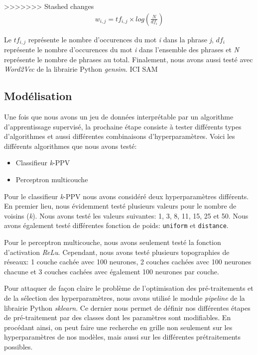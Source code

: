 >>>>>>> Stashed changes
\begin{gather}
  w_{i,j} = tf_{i,j} \times log(\frac{N}{df_i})
\end{gather}

Le $tf_{i,j}$ représente le nombre d'occurences du mot \textit{i} dans la phrase \textit{j}, $df_i$ représente le nombre d'occurences du mot \textit{i} dans l'ensemble des phrases et \textit{N} représente le nombre de phrases au total. 
Finalement, nous avons aussi testé avec \textit{Word2Vec} de la librairie Python \textit{gensim}. ICI SAM


\subsection{Modélisation}

Une fois que nous avons un jeu de données interprétable par un algorithme d'apprentissage supervisé, la prochaine étape consiste à tester différents types d'algorithmes et aussi différentes combinaisons d'hyperparamètres. Voici les différents algorithmes que nous avons testé:

\begin{itemize}
  \item Classifieur \textit{k}-PPV
  \item Perceptron multicouche
\end{itemize}

Pour le classifieur \textit{k}-PPV nous avons considéré deux hyperparamètres différents. En premier lieu, nous évidemment testé plusieurs valeurs pour le nombre de voisins (\textit{k}). Nous avons testé les valeurs suivantes: 1, 3, 8, 11, 15, 25 et 50. 
Nous avons également testé différentes fonction de poids: \texttt{uniform} et \texttt{distance}.

Pour le perceptron multicouche, nous avons seulement testé la fonction d'activation \textit{ReLu}. Cependant, nous avons testé plusieurs topographies de réseaux: 1 couche cachée avec 100 neurones, 2 couches cachées avec 100 neurones chacune et 3 couches cachées avec également 100 neurones par couche.
\break

Pour attaquer de façon claire le problème de l'optimisation des pré-traitements et de la sélection des hyperparamètres, nous avons utilisé le module \emph{pipeline} de la librairie Python \emph{sklearn}. Ce dernier nous permet de définir nos différentes étapes de pré-traitement par des classes dont les paramètres sont modifiables. En procédant ainsi, on peut faire une recherche en grille non seulement sur les hyperparamètres de nos modèles, mais aussi sur les différentes prétraitements possibles.
\break

